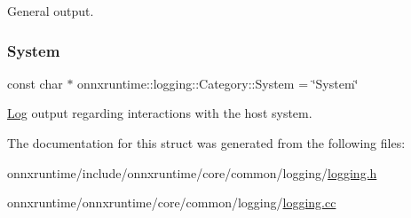 General output. 

\mbox{\label{structonnxruntime_1_1logging_1_1Category_a923c405d07be36f1bbd6c06548ba0267}} 
\subsubsection{\texorpdfstring{System}{System}}
{\footnotesize\ttfamily const char $\ast$ onnxruntime\+::logging\+::\+Category\+::\+System = \char`\"{}System\char`\"{}\hspace{0.3cm}{\ttfamily [static]}}



\mbox{\hyperlink{classonnxruntime_1_1Log}{Log}} output regarding interactions with the host system. 



The documentation for this struct was generated from the following files\+:\begin{DoxyCompactItemize}
\item 
onnxruntime/include/onnxruntime/core/common/logging/\mbox{\hyperlink{logging_8h}{logging.\+h}}\item 
onnxruntime/onnxruntime/core/common/logging/\mbox{\hyperlink{logging_8cc}{logging.\+cc}}\end{DoxyCompactItemize}
